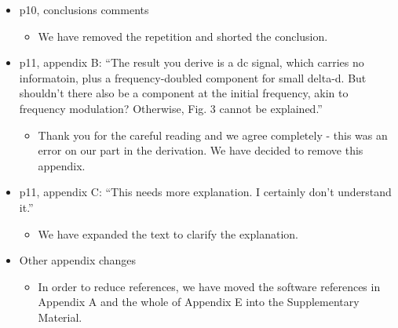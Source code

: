 \documentclass[a4paper, 10pt]{letter}
\begin{document}
\begin{itemize}
\item p10, conclusions comments
\begin{itemize}
\item We have removed the repetition and shorted the conclusion. 
\end{itemize}

\item p11, appendix B: ``The result you derive is a dc signal, which carries no informatoin, plus a frequency-doubled component for small delta-d. But shouldn't there also be a component at the initial frequency, akin to frequency modulation? Otherwise, Fig. 3 cannot be explained.''
\begin{itemize}
\item Thank you for the careful reading and we agree completely - this was an error on our part in the derivation. We have decided to remove this appendix. 
\end{itemize}

\item p11, appendix C: ``This needs more explanation. I certainly don't understand it.''
\begin{itemize}
\item We have expanded the text to clarify the explanation. 
\end{itemize}

\item Other appendix changes
\begin{itemize}
\item In order to reduce references, we have moved the software references in Appendix A and the whole of Appendix E into the Supplementary Material. 
\end{itemize}

\end{itemize}
\end{document}
